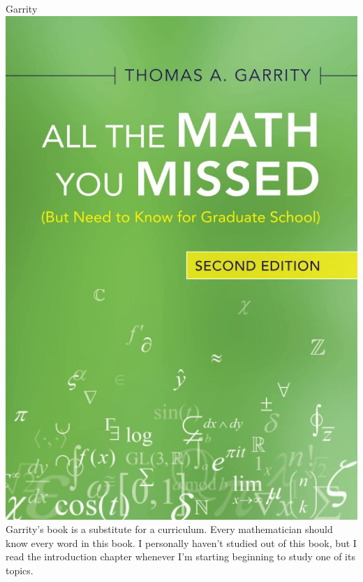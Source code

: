 \begin{boxResource}[lefthand width=5cm, sidebyside]{Garrity}
\includegraphics[width=\textwidth]{./img/Garrity_Math.jpg}
\tcblower
Garrity's book is a substitute for a curriculum.
Every mathematician should know every word in this book.
I personally haven't studied out of this book, but I read the introduction chapter whenever I'm starting beginning to study one of its topics.
\end{boxResource}
%
